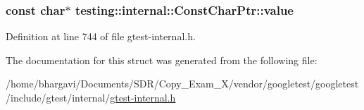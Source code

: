 \subsubsection[{\texorpdfstring{value}{value}}]{\setlength{\rightskip}{0pt plus 5cm}const char$\ast$ testing\+::internal\+::\+Const\+Char\+Ptr\+::value}\hypertarget{structtesting_1_1internal_1_1_const_char_ptr_adba40d23d5986904b605946f643cf26e}{}\label{structtesting_1_1internal_1_1_const_char_ptr_adba40d23d5986904b605946f643cf26e}


Definition at line 744 of file gtest-\/internal.\+h.



The documentation for this struct was generated from the following file\+:\begin{DoxyCompactItemize}
\item 
/home/bhargavi/\+Documents/\+S\+D\+R/\+Copy\+\_\+\+Exam\+\_\+X/vendor/googletest/googletest/include/gtest/internal/\hyperlink{gtest-internal_8h}{gtest-\/internal.\+h}\end{DoxyCompactItemize}

